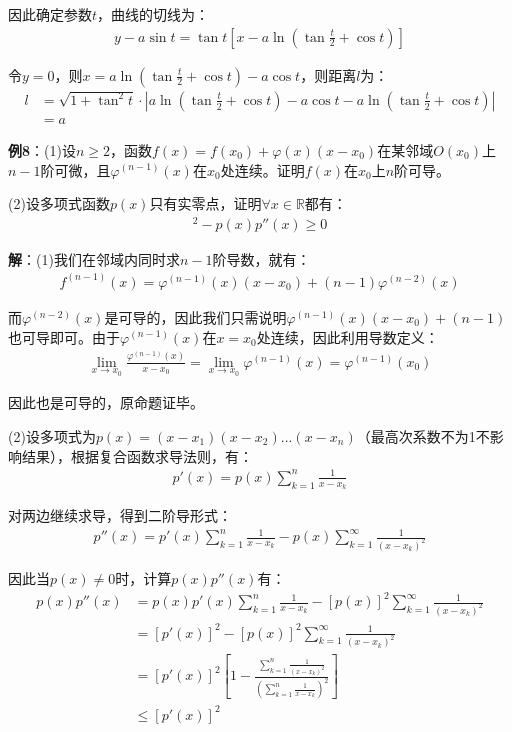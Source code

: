\documentclass{ctexart}
\let\oldtextbf\textbf %
\renewcommand{\textbf}[1]{\textcolor{btex}{\oldtextbf{#1}}} %
\begin{document}
因此确定参数$t$，曲线的切线为：
\begin{align*}
y-a\sin t=\tan t\left[x-a\ln(\tan\frac{t}{2}+\cos t) \right]
\end{align*}

令$y=0$，则$x=a\ln(\tan\frac{t}{2}+\cos t)-a\cos t$，则距离$l$为：
\begin{align*}
l&=\sqrt{1+\tan^2 t} \cdot\left|a\ln(\tan\frac{t}{2}+\cos t) -a\cos t-a\ln(\tan\frac{t}{2}+\cos t)\right|\\
&=a
\end{align*}

\textbf{例8}：(1)设$n\geq 2$，函数$f(x)=f(x_0)+\varphi(x)(x-x_0)$在某邻域$O(x_0)$上$n-1$阶可微，且$\varphi^{(n-1)}(x)$在$x_0$处连续。证明$f(x)$在$x_0$上$n$阶可导。

(2)设多项式函数$p(x)$只有实零点，证明$\forall x\in\mathbb{R}$都有：
\begin{align*}
    [p'(x)]^2-p(x)p''(x)\geq 0
\end{align*}

\textbf{解}：(1)我们在邻域内同时求$n-1$阶导数，就有：
\begin{align*}
f^{(n-1)}(x)=\varphi^{(n-1)}(x)(x-x_0)+(n-1)\varphi^{(n-2)}(x)
\end{align*}

而$\varphi^{(n-2)}(x)$是可导的，因此我们只需说明$\varphi^{(n-1)}(x)(x-x_0)+(n-1)$也可导即可。由于$\varphi^{(n-1)}(x)$在$x=x_0$处连续，因此利用导数定义：
\begin{align*}
\lim_{x\to x_0}\frac{\varphi^{(n-1)}(x)}{x-x_0}=\lim_{x\to x_0} \varphi^{(n-1)}(x)=\varphi^{(n-1)}(x_0)
\end{align*}

因此也是可导的，原命题证毕。

(2)设多项式为$p(x)=(x-x_1)(x-x_2)...(x-x_n)$（最高次系数不为1不影响结果），根据复合函数求导法则，有：
\begin{align*}
    p'(x)=p(x)\sum_{k=1}^n\frac{1}{x-x_k}
\end{align*}

对两边继续求导，得到二阶导形式：
\begin{align*}
p''(x)=p'(x)\sum_{k=1}^n\frac{1}{x-x_k}-p(x)\sum_{k=1}^\infty\frac{1}{(x-x_k)^2}  
\end{align*}

因此当$p(x)\neq 0$时，计算$p(x)p''(x)$有：
\begin{align*}
p(x)p''(x)&=p(x)p'(x)\sum_{k=1}^n\frac{1}{x-x_k}-[p(x)]^2\sum_{k=1}^\infty\frac{1}{(x-x_k)^2} \\
 &=[p'(x)]^2-[p(x)]^2\sum_{k=1}^\infty\frac{1}{(x-x_k)^2}\\
&=[p'(x)]^2\left[1-\frac{\sum_{k=1}^n\frac{1}{(x-x_k)^2}}{(\sum_{k=1}^n\frac{1}{x-x_k})^2} \right]\\
&\leq [p'(x)]^2
\end{align*}
\end{document}
